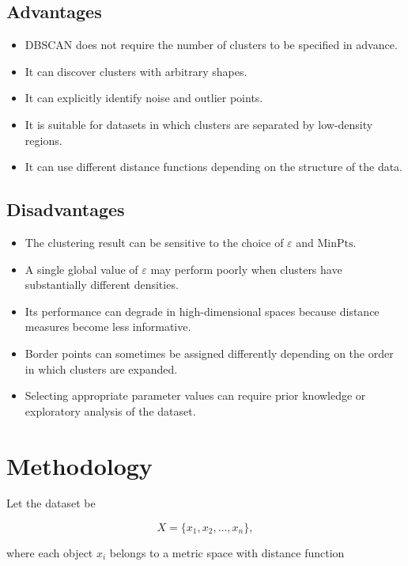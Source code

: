 \documentclass[a4paper]{article}
\begin{document}
      \subsection{Advantages}

         \begin{itemize}
            \item DBSCAN does not require the number of clusters to be specified in advance.
            \item It can discover clusters with arbitrary shapes.
            \item It can explicitly identify noise and outlier points.
            \item It is suitable for datasets in which clusters are separated by low-density regions.
            \item It can use different distance functions depending on the structure of the data.
         \end{itemize}

      \subsection{Disadvantages}

         \begin{itemize}
            \item The clustering result can be sensitive to the choice of $\varepsilon$ and $\mathrm{MinPts}$.
            \item A single global value of $\varepsilon$ may perform poorly when clusters have substantially different densities.
            \item Its performance can degrade in high-dimensional spaces because distance measures become less informative.
            \item Border points can sometimes be assigned differently depending on the order in which clusters are expanded.
            \item Selecting appropriate parameter values can require prior knowledge or exploratory analysis of the dataset.
         \end{itemize}
   \section{Methodology}

      Let the dataset be

      \[
      X = \{x_1, x_2, \dots, x_n\},
      \]

      where each object \(x_i\) belongs to a metric space with distance function
\end{document}
